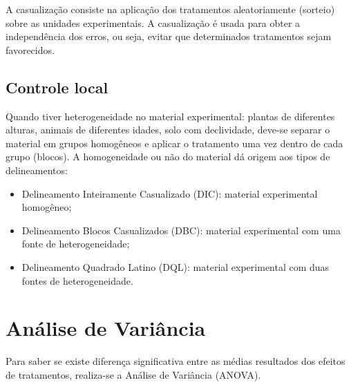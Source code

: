 \documentclass[12pt,brazil,]{book}
\begin{document}
A casualização consiste na aplicação dos tratamentos aleatoriamente
(sorteio) sobre as unidades experimentais. A casualização é usada para
obter a independência dos erros, ou seja, evitar que determinados
tratamentos sejam favorecidos.

\hypertarget{controle-local}{%
\subsection{Controle local}\label{controle-local}}

Quando tiver heterogeneidade no material experimental: plantas de
diferentes alturas, animais de diferentes idades, solo com declividade,
deve-se separar o material em grupos homogêneos e aplicar o tratamento
uma vez dentro de cada grupo (blocos). A homogeneidade ou não do
material dá origem aos tipos de delineamentos:

\begin{itemize}
\item
  Delineamento Inteiramente Casualizado (DIC): material experimental
  homogêneo;
\item
  Delineamento Blocos Casualizados (DBC): material experimental com uma
  fonte de heterogeneidade;
\item
  Delineamento Quadrado Latino (DQL): material experimental com duas
  fontes de heterogeneidade.
\end{itemize}

\hypertarget{analise-de-variancia}{%
\section{Análise de Variância}\label{analise-de-variancia}}

Para saber se existe diferença significativa entre as médias resultados
dos efeitos de tratamentos, realiza-se a Análise de Variância (ANOVA).
\end{document}
